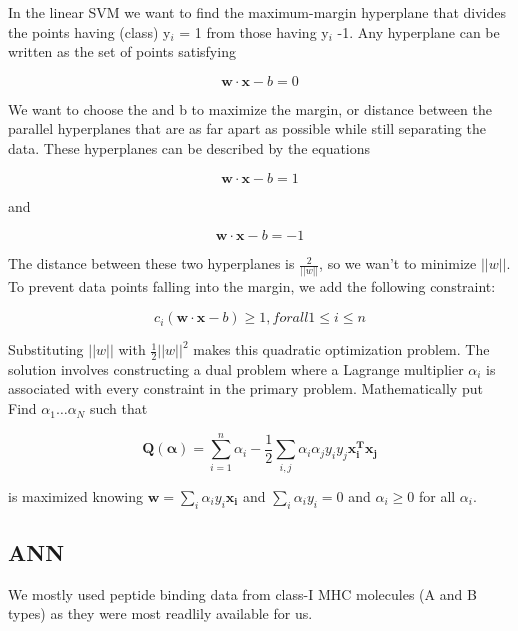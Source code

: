 In the linear SVM we want to find the maximum-margin hyperplane that divides the points having (class) y$_{i}$ = 1 from those having y$_i$  -1. Any hyperplane can be written as the set of points satisfying

\begin{equation}
\mathbf{w \cdot x} - b = 0
\end{equation}

We want to choose the  and b to maximize the margin, or distance between the parallel hyperplanes that are as far apart as possible while still separating the data. These hyperplanes can be described by the equations

\begin{equation}
\mathbf{w \cdot x} - b = 1
\end{equation}

and

\begin{equation}
\mathbf{w \cdot x} - b = -1
\end{equation}

The distance between these two hyperplanes is $\frac{2}{||w||}$, so we wan't to minimize $||w||$.
To prevent data points falling into the margin, we add the following constraint:

\begin{equation}
c_i(\mathbf{w \cdot x} - b) \geq 1, for all 1 \leq i \leq n
\end{equation}

Substituting $||w||$ with $\frac{1}{2}||w||^2$ makes this quadratic optimization problem. 
The solution involves constructing a dual problem where 
a Lagrange multiplier $\alpha_i$ 
is associated with every 
constraint in the primary problem. Mathematically put Find $\alpha_1…\alpha_N$
such that

\begin{equation}
\mathbf{Q(\alpha)} = \sum_{i=1}^{n}{\alpha_i} - \frac{1}{2}\sum_{i,j}{\alpha_i\alpha_j y_i y_j \mathbf{x_i^T x_j} }
\end{equation}

is maximized knowing $\mathbf{w} = \sum_{i}{ \alpha_i y_i \mathbf{x_i} }$ and $\sum_{i}{\alpha_i y_i} = 0$ and $\alpha_i \geq 0$ for all $\alpha_i$.

\subsection*{ANN}
We mostly used peptide binding data from class-I MHC molecules (A and B types) as they were most readlily available for us.

